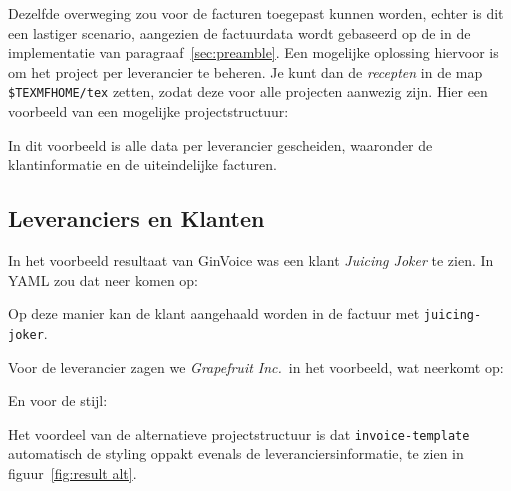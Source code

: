 Dezelfde overweging zou voor de facturen toegepast kunnen worden, echter is dit een lastiger scenario, aangezien de factuurdata wordt gebaseerd op de  in de implementatie van paragraaf~\ref{sec:preamble}.
Een mogelijke oplossing hiervoor is om het project per leverancier te beheren.
Je kunt dan de \textit{recepten} in de map \texttt{\$TEXMFHOME/tex} zetten, zodat deze voor alle projecten aanwezig zijn.
Hier een voorbeeld van een mogelijke projectstructuur:\\[6pt]
\begin{minipage}{.49\linewidth}
\end{minipage}%
\hfill
\begin{minipage}{.49\linewidth}
\end{minipage}
In dit voorbeeld is alle data per leverancier gescheiden, waaronder de klantinformatie en de uiteindelijke facturen.


\subsection{Leveranciers en Klanten}\label{sec:supplier and client}
In het voorbeeld resultaat van GinVoice was een klant \textit{Juicing Joker} te zien.
In YAML zou dat neer komen op:


Op deze manier kan de klant aangehaald worden in de factuur met \texttt{juicing-joker}.

Voor de leverancier zagen we \textit{Grapefruit Inc.}\ in het voorbeeld, wat neerkomt op:


En voor de stijl:


Het voordeel van de alternatieve projectstructuur is dat \texttt{invoice-template} automatisch de styling oppakt evenals de leveranciersinformatie, te zien in figuur~\ref{fig:result alt}.

